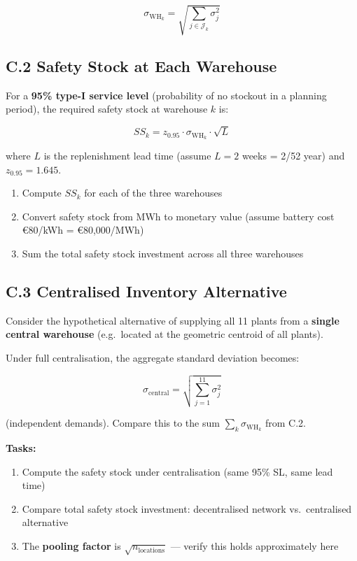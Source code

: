 \documentclass[
  a4paper,
]{article}
\providecommand{\tightlist}{%
  \setlength{\itemsep}{0pt}\setlength{\parskip}{0pt}}
\begin{document}
\[\sigma_{\text{WH}_k} = \sqrt{\sum_{j \in \mathcal{J}_k} \sigma_j^2}\]

\subsection{C.2 Safety Stock at Each
Warehouse}\label{c.2-safety-stock-at-each-warehouse}

For a \textbf{95\% type-I service level} (probability of no stockout in
a planning period), the required safety stock at warehouse \(k\) is:

\[SS_k = z_{0.95} \cdot \sigma_{\text{WH}_k} \cdot \sqrt{L}\]

where \(L\) is the replenishment lead time (assume \(L = 2\) weeks =
2/52 year) and \(z_{0.95} = 1.645\).

\begin{enumerate}
\def\labelenumi{\arabic{enumi}.}
\tightlist
\item
  Compute \(SS_k\) for each of the three warehouses
\item
  Convert safety stock from MWh to monetary value (assume battery cost
  €80/kWh = €80,000/MWh)
\item
  Sum the total safety stock investment across all three warehouses
\end{enumerate}

\subsection{C.3 Centralised Inventory
Alternative}\label{c.3-centralised-inventory-alternative}

Consider the hypothetical alternative of supplying all 11 plants from a
\textbf{single central warehouse} (e.g.~located at the geometric
centroid of all plants).

Under full centralisation, the aggregate standard deviation becomes:

\[\sigma_{\text{central}} = \sqrt{\sum_{j=1}^{11} \sigma_j^2}\]

(independent demands). Compare this to the sum
\(\sum_k \sigma_{\text{WH}_k}\) from C.2.

\textbf{Tasks:}

\begin{enumerate}
\def\labelenumi{\arabic{enumi}.}
\tightlist
\item
  Compute the safety stock under centralisation (same 95\% SL, same lead
  time)
\item
  Compare total safety stock investment: decentralised network
  vs.~centralised alternative
\item
  The \textbf{pooling factor} is \(\sqrt{n_{\text{locations}}}\) ---
  verify this holds approximately here
\end{enumerate}
\end{document}
